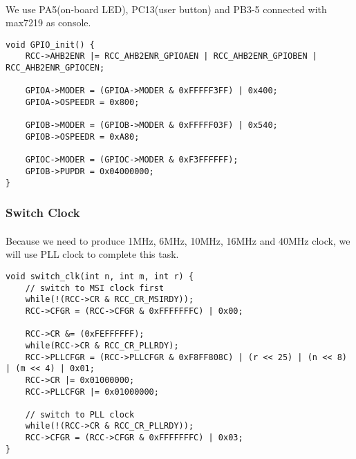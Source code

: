 \paragraph{}
We use PA5(on-board LED), PC13(user button) and PB3-5 connected with max7219 as console.
\begin{lstlisting}
void GPIO_init() {
	RCC->AHB2ENR |= RCC_AHB2ENR_GPIOAEN | RCC_AHB2ENR_GPIOBEN | RCC_AHB2ENR_GPIOCEN;

	GPIOA->MODER = (GPIOA->MODER & 0xFFFFF3FF) | 0x400;
	GPIOA->OSPEEDR = 0x800;

	GPIOB->MODER = (GPIOB->MODER & 0xFFFFF03F) | 0x540;
	GPIOB->OSPEEDR = 0xA80;

	GPIOC->MODER = (GPIOC->MODER & 0xF3FFFFFF);
	GPIOB->PUPDR = 0x04000000;
}
\end{lstlisting}
\subsubsection{Switch Clock}
\paragraph{}
Because we need to produce 1MHz, 6MHz, 10MHz, 16MHz and 40MHz clock, we will use PLL clock to complete this task.
\begin{lstlisting}
void switch_clk(int n, int m, int r) {
	// switch to MSI clock first
	while(!(RCC->CR & RCC_CR_MSIRDY));
	RCC->CFGR = (RCC->CFGR & 0xFFFFFFFC) | 0x00;

	RCC->CR &= (0xFEFFFFFF);
	while(RCC->CR & RCC_CR_PLLRDY);
	RCC->PLLCFGR = (RCC->PLLCFGR & 0xF8FF808C) | (r << 25) | (n << 8) | (m << 4) | 0x01;
	RCC->CR |= 0x01000000;
	RCC->PLLCFGR |= 0x01000000;

	// switch to PLL clock
	while(!(RCC->CR & RCC_CR_PLLRDY));
	RCC->CFGR = (RCC->CFGR & 0xFFFFFFFC) | 0x03;
}
\end{lstlisting}
